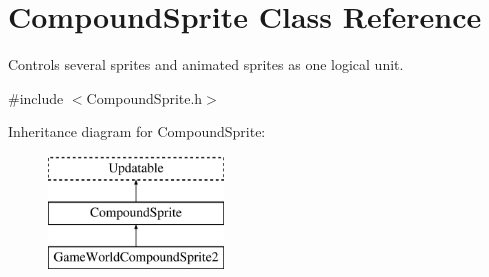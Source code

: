 \hypertarget{class_compound_sprite}{}\section{Compound\+Sprite Class Reference}
\label{class_compound_sprite}


Controls several sprites and animated sprites as one logical unit.  




{\ttfamily \#include $<$Compound\+Sprite.\+h$>$}

Inheritance diagram for Compound\+Sprite\+:\begin{figure}[H]
\begin{center}
\leavevmode
\includegraphics[height=3.000000cm]{class_compound_sprite}
\end{center}
\end{figure}
